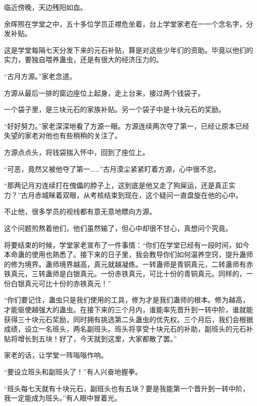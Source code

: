 
\begin{this_body}

临近傍晚，天边残阳如血。

余晖照在学堂之中，五十多位学员正襟危坐着，台上学堂家老在一一个念名字，分发补贴。

这是学堂每隔七天分发下来的元石补贴，算是对这些少年们的资助。毕竟以他们的实力，要独自喂养蛊虫，还是有很大的经济压力的。

“古月方源。”家老念道。

方源从最后一排的窗边座位上起身，走上台来，接过两个钱袋子。

一个袋子里，是三块元石的家族补贴。另一个袋子中是十块元石的奖励。

“好好努力。”家老深深地看了方源一眼。方源连续两次夺了第一，已经让原本已经失望的家老对他也有些稍稍的关注了。

方源点点头，将钱袋揣入怀中，回到了座位上。

“可恶，竟然又被他夺了第一……”古月漠尘紧紧盯着方源，心中很不忿。

“那两记月刃连续打在傀儡的脖子上，这到底是他又走了狗屎运，还是真正实力？”古月赤城眯着双眼，从考核结束到现在，这个疑问一直盘旋在他的心中。

不止他，很多学员的视线都有意无意地瞟向方源。

这个问题煎熬着他们，他们虽然输了，但心中却很不甘心，真想问个究竟。

将要结束的时候，学堂家老宣布了一件事情：“你们在学堂已经有一段时间，如今本命蛊的使用也熟悉了。接下来的日子里，我会教导你们如何温养空窍，提升蛊师的修为境界。蛊师境界越高，真元就越凝练。一转蛊师是青铜真元，二转蛊师有赤铁真元，三转蛊师是白银真元。一份赤铁真元，可比十份的青铜真元。同样的，一份白银真元可比十份的赤铁真元！”

“你们要记住，蛊虫只是我们使用的工具，修为才是我们蛊师的根本。修为越高，才能驱使越强大的蛊虫。在接下来的三个月内，谁能率先晋升到一转中阶，谁就能获得三十块元石奖励，同时拥有挑选第二头蛊虫的优先权。三个月后，我们会根据成绩，设立一名班头，两名副班头。班头将享受十块元石的补助，副班头的元石补贴将增长到五块！好了，今天就到这里，大家都散了罢。”

家老的话，让学堂一阵嗡嗡作响。

“要设立班头和副班头了！”有人兴奋地握拳。

“班头每七天就有十块元石，副班头也有五块？要是我能第一个晋升到一转中阶，我一定能成为班头。”有人眼中冒着光。


\end{this_body}
